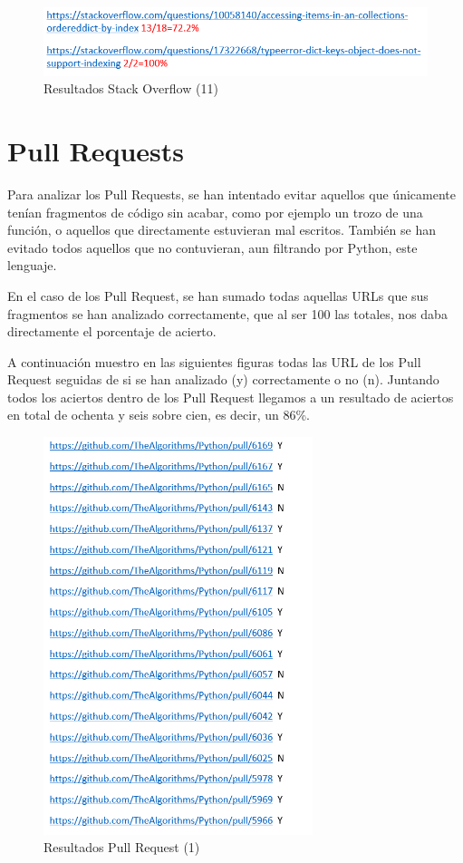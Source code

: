 \documentclass[a4paper, 12pt]{book}
\begin{document}
\begin{figure}
	\centering
    \includegraphics[width=1\textwidth]{img/stack15}
    \caption{Resultados Stack Overflow (11)}
    
 \end{figure}

\newpage

\section{Pull Requests}

Para analizar los Pull Requests, se han intentado evitar aquellos que únicamente tenían fragmentos de código sin acabar, como por ejemplo un trozo de una función, o aquellos que directamente estuvieran mal escritos. También se han evitado todos aquellos que no contuvieran, aun filtrando por Python, este lenguaje.

En el caso de los Pull Request, se han sumado todas aquellas URLs que sus fragmentos se han analizado correctamente, que al ser 100 las totales, nos daba directamente el porcentaje de acierto. 

A continuación muestro en las siguientes figuras todas las URL de los Pull Request seguidas de si se han analizado (y) correctamente o no (n). Juntando todos los aciertos dentro de los Pull Request llegamos a un resultado de aciertos en total de ochenta y seis sobre cien, es decir, un 86\%.


\begin{figure}
	\centering
    \includegraphics[width=0.7\textwidth]{img/git5}
    \caption{Resultados Pull Request (1)}
 \end{figure}
 
\end{document}
